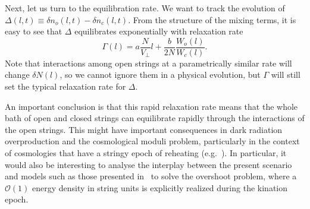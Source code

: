 \documentclass[a4paper,11pt]{article}
\begin{document}
Next, let us turn to  the equilibration rate. We want to track the evolution of
 $\Delta(l,t) \equiv \delta n_o(l,t)-\delta n_c(l,t)$. 
From the structure of the mixing terms, it is easy to see that
$\Delta$ equilibrates exponentially with relaxation rate \begin{equation}
\Gamma(l) =a\frac{N}{V_\perp}l+\frac{b}{2N}\frac{W_o(l)}{W_c (l)} .
\end{equation}
Note that interactions among open strings at
a parametrically similar rate will change $\delta N(l)$, so we cannot ignore them in a physical evolution, but  $\Gamma$ will 
still set the typical relaxation rate for $\Delta$. 

An important conclusion is that this rapid relaxation rate means that the 
whole bath of open and closed strings can equilibrate rapidly through the
interactions of the open strings.
This might have important consequences in dark radiation overproduction and the cosmological moduli problem, particularly in the context of cosmologies that have a stringy epoch of reheating
(e.g.~\cite{Frey:2005jk,Frey:2021jyo}). In particular, it would also be interesting to analyse the interplay between the present scenario and models such as those presented in~\cite{Apers:2022cyl,Conlon:2022pnx} to solve the overshoot problem, where a $\mathcal{O}(1)$ energy density in string units is explicitly realized during the kination epoch.
\end{document}
